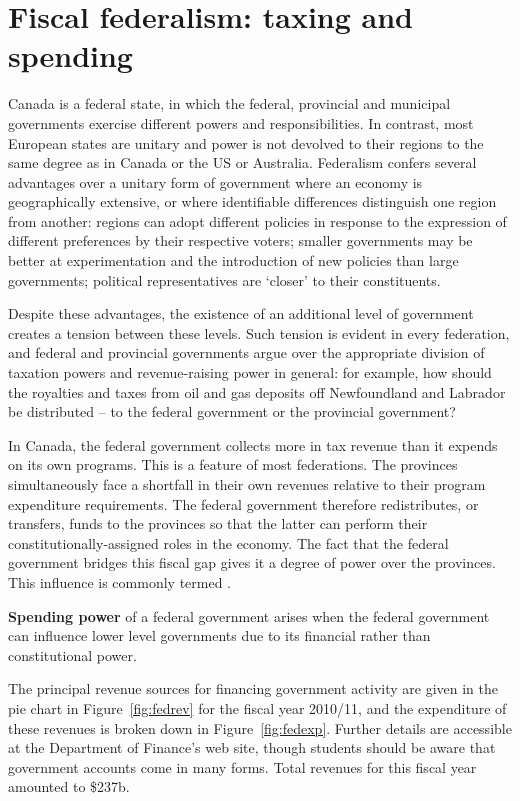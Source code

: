 \section{Fiscal federalism: taxing and spending}\label{sec:ch14sec2}

Canada is a federal state, in which the federal, provincial and municipal governments exercise different powers and responsibilities. In contrast, most European states are unitary and power is not devolved to their regions to the same degree as in Canada or the US or Australia. Federalism confers several advantages over a unitary form of government where an economy is geographically extensive, or where identifiable differences distinguish one region from another: regions can adopt different policies in response to the expression of different preferences by their respective voters; smaller governments may be better at experimentation and the introduction of new policies than large governments; political representatives are `closer' to their constituents.

Despite these advantages, the existence of an additional level of government creates a tension between these levels. Such tension is evident in every federation, and federal and provincial governments argue over the appropriate division of taxation powers and revenue-raising power in general: for example, how should the royalties and taxes from oil and gas deposits off Newfoundland and Labrador be distributed -- to the federal government or the provincial government?

In Canada, the federal government collects more in tax revenue than it expends on its own programs. This is a feature of most federations. The provinces simultaneously face a shortfall in their own revenues relative to their program expenditure requirements. The federal government therefore redistributes, or transfers, funds to the provinces so that the latter can perform their constitutionally-assigned roles in the economy. The fact that the federal government bridges this fiscal gap gives it a degree of power over the provinces. This influence is commonly termed .

\begin{DefBox}
\textbf{Spending power} of a federal government arises when the federal government can influence lower level governments due to its financial rather than constitutional power.
\end{DefBox}

The principal revenue sources for financing government activity are given in the pie chart in Figure~\ref{fig:fedrev} for the fiscal year 2010/11, and the expenditure of these revenues is broken down in Figure~\ref{fig:fedexp}. Further details are accessible at the Department of Finance's web site, though students should be aware that government accounts come in many forms. Total revenues for this fiscal year amounted to \$237b.

